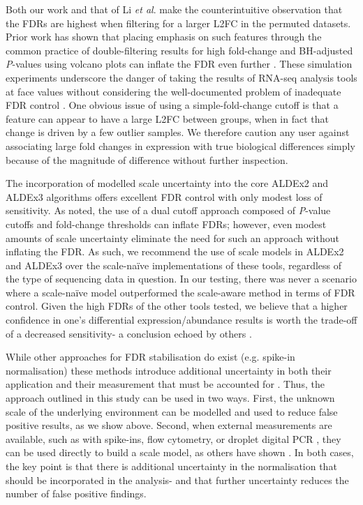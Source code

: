 \documentclass[10pt,letterpaper]{article}
\begin{document}
Both our work and that of Li \textit{et al}. make the counterintuitive observation that the FDRs are highest when filtering for a larger L2FC in the permuted datasets. Prior work has shown that placing emphasis on such features through the common practice of double-filtering results for high fold-change and BH-adjusted \textit{P}-values using volcano plots can inflate the FDR even further \cite{Cui:2003aa, bourgon_independent_2010}. These simulation experiments underscore the danger of taking the results of RNA-seq analysis tools at face values without considering the well-documented problem of inadequate FDR control \cite{witten2007comparison, Zhang:2009aa}. One obvious issue of using a simple-fold-change cutoff is that a feature can appear to have a large L2FC between groups, when in fact that change is driven by a few outlier samples. We therefore caution any user against associating large fold changes in expression with true biological differences simply because of the magnitude of difference without further inspection.

The incorporation of modelled scale uncertainty into the core ALDEx2 and ALDEx3 algorithms offers excellent FDR control with only modest loss of sensitivity. As noted, the use of a dual cutoff approach composed of \textit{P}-value cutoffs and fold-change thresholds can inflate FDRs; however, even modest amounts of scale uncertainty eliminate the need for such an approach without inflating the FDR. As such, we recommend the use of scale models in ALDEx2 and ALDEx3 over the scale-na\"ive implementations of these tools, regardless of the type of sequencing data in question. In our testing, there was never a scenario where a scale-na\"ive model outperformed the scale-aware method in terms of FDR control. Given the high FDRs of the other tools tested, we believe that a higher confidence in one's differential expression/abundance results is worth the trade-off of a decreased sensitivity- a conclusion echoed by others \cite{Nearing:2022aa, weiss_normalization_2017}. 

While other approaches for FDR stabilisation do exist (e.g. spike-in normalisation) these methods introduce additional uncertainty in both their application and their measurement that must be accounted for \cite{risso_normalization_2014}. Thus, the approach outlined in this study can be used in two ways. First, the unknown scale of the underlying environment can be modelled and used to reduce false positive results, as we show above. Second, when external measurements are available, such as with spike-ins, flow cytometry, or droplet digital PCR \cite{lin_towards_2019, barlow_quantitative_2020}, they can be used directly to build a scale model, as others have shown \cite{konnaris_uncertainty_2025}. In both cases, the key point is that there is additional uncertainty in the normalisation that should be incorporated in the analysis- and that further uncertainty reduces the number of false positive findings.
\end{document}
